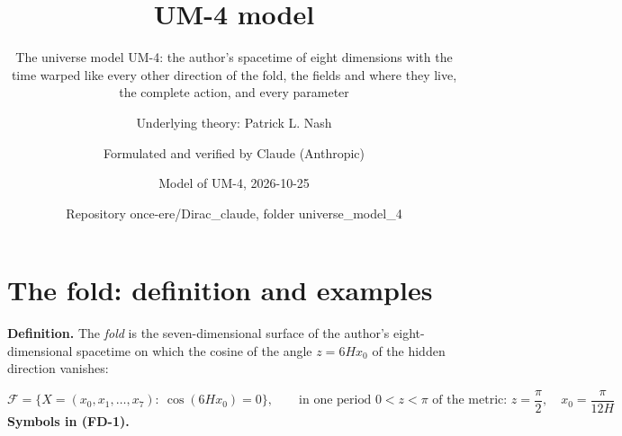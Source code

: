 \documentclass[
  10pt,
]{article}
\title{UM-4 model}
\subtitle{The universe model UM-4: the author's spacetime of eight
dimensions with the time warped like every other direction of the fold,
the fields and where they live, the complete action, and every
parameter}
\author{Underlying theory: Patrick L. Nash \and Formulated and verified
by Claude (Anthropic) \and Model of UM-4, 2026-10-25 \and Repository
once-ere/Dirac\_claude, folder universe\_model\_4}
\date{}
\begin{document}
\maketitle

{
\hypersetup{linkcolor=}
\setcounter{tocdepth}{3}
\tableofcontents
}
\hypertarget{the-fold-definition-and-examples}{%
\section{The fold: definition and
examples}\label{the-fold-definition-and-examples}}

\textbf{Definition.} The \emph{fold} is the seven-dimensional surface of
the author's eight-dimensional spacetime on which the cosine of the
angle \(z = 6Hx_0\) of the hidden direction vanishes:

\[
\mathcal{F} = \big\{X = (x_0, x_1, \dots, x_7):\ \cos(6Hx_0) = 0\big\},\qquad
\text{in one period } 0 < z < \pi\text{ of the metric: } z = \frac{\pi}{2},\quad x_0 = \frac{\pi}{12H} \tag{FD-1}
\] \textbf{Symbols in (FD-1).}
\end{document}
